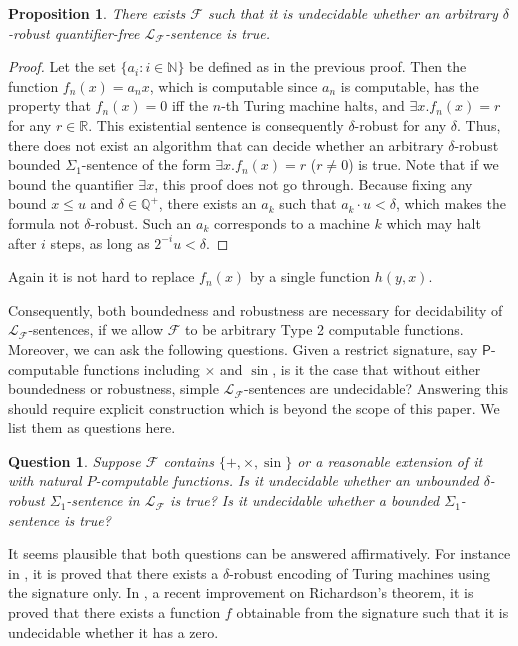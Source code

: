 \documentclass[conference]{IEEEtran}
\newtheorem{proposition}[theorem]{Proposition}
\newtheorem{question}[theorem]{Question}
\begin{document}
\begin{proposition}
There exists $\mathcal{F}$ such that it is undecidable whether an arbitrary $\delta$-robust quantifier-free $\mathcal{L}_{\mathcal{F}}$-sentence is true. 
\end{proposition}

\begin{proof}
Let the set $\{a_i: i\in \mathbb{N}\}$ be defined as in the previous proof. Then the function $f_n(x) = a_nx$, which is computable since $a_n$ is computable, has the property that $f_n(x) = 0$ iff the $n$-th Turing machine halts, and $\exists x. f_n(x) = r$ for any $r\in \mathbb{R}$. This existential sentence is consequently $\delta$-robust for any $\delta$. Thus, there does not exist an algorithm that can decide whether an arbitrary $\delta$-robust bounded $\Sigma_1$-sentence of the form $\exists x. f_n(x)=r$ ($r\neq 0$) is true. Note that if we bound the quantifier $\exists x$, this proof does not go through. Because fixing any bound $x\leq u$ and $\delta\in \mathbb{Q}^+$, there exists an $a_k$ such that $a_k\cdot u<\delta$, which makes the formula not $\delta$-robust. Such an $a_k$ corresponds to a machine $k$ which may halt after $i$ steps, as long as $2^{-i}u<\delta$. 
\end{proof}

Again it is not hard to replace $f_n(x)$ by a single function $h(y,x)$.

Consequently, both boundedness and robustness are necessary for decidability of $\mathcal{L}_\mathcal{F}$-sentences, if we allow $\mathcal{F}$ to be arbitrary Type 2 computable functions. Moreover, we can ask the following questions. Given a restrict signature, say $\mathsf{P}$-computable functions including $\times$ and $\sin$, is it the case that without either boundedness or robustness, simple $\mathcal{L}_{\mathcal{F}}$-sentences are undecidable? Answering this should require explicit construction which is beyond the scope of this paper. We list them as questions here. 

\begin{question}
Suppose $\mathcal{F}$ contains $\{+,\times, \sin\}$ or a reasonable extension of it with natural $P$-computable functions. Is it undecidable whether an unbounded $\delta$-robust $\Sigma_1$-sentence in $\mathcal{L}_{\mathcal{F}}$ is true? Is it undecidable whether a bounded $\Sigma_1$-sentence is true?
\end{question}

It seems plausible that both questions can be answered affirmatively. For instance in \cite{Gra05robustsimulations}, it is proved that there exists a $\delta$-robust encoding of Turing machines using the signature only. In \cite{Laczkovich02theremoval}, a recent improvement on Richardson's theorem, it is proved that there exists a function $f$ obtainable from the signature such that it is undecidable whether it has a zero. 
\end{document}
